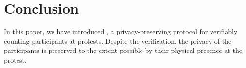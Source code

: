 \section{Conclusion}%
\label{Conclusion}

In this paper, we have introduced \PRIVO, a privacy-preserving protocol for verifiably counting participants at protests. 
Despite the verification, the privacy of the participants is preserved to the extent possible by their physical presence at the protest. 


